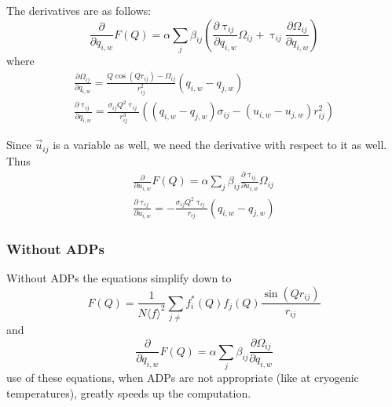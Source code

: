 \noindent The derivatives are as follows:
\begin{equation}
\frac{\partial}{\partial q_{i,w}} F{ (Q )} = \alpha \sum_{j} \beta_{ij} (\frac{\partial \uptau_{ij}}{\partial q_{i,w}}  \Omega_{ij} + \uptau_{ij} \frac{\partial \Omega_{ij}}{\partial q_{i,w}}) \label{eq:grad_fq}
\end{equation}
where
\begin{eqnarray}
  \frac{\partial \Omega_{ij}}{\partial q_{i,w}}  = \frac{Q\cos(Qr_{ij}) - \Omega_{ij}}{r_{ij}^{2}} (q_{i,w}-q_{j,w})\\
  \frac{\partial \uptau_{ij}}{\partial q_{i,w}} = \frac{\sigma_{ij}Q^{2} \uptau_{ij}}{r_{ij}^{3}}   ((q_{i,w} - q_{j,w}) \sigma_{ij}- ( u_{i,w} - u_{j,w})r_{ij}^{2})
\end{eqnarray}

Since $\vec{u}_{ij}$ is a variable as well, we need the derivative with respect to it as well.
Thus
\begin{eqnarray}
\frac{\partial}{\partial u_{i,w}} F{ (Q )} = \alpha \sum_{j} \beta_{ij} \frac{\partial \uptau_{ij}}{\partial u_{i,w}}  \Omega_{ij}\\
\frac{\partial \uptau_{ij}}{\partial u_{i,w}} = - \frac{\sigma_{ij}Q^{2} \uptau_{ij}}{r_{ij}}  (q_{i,w} - q_{j,w})
\end{eqnarray}
\subsubsection{Without ADPs}
Without ADPs the equations simplify down to
\begin{equation}
F(Q) = \frac{1}{N \langle f \rangle^{2}} \sum_{j\neq} f_i^{*}(Q)f_j(Q) \frac{\sin(Qr_{ij})}{r_{ij}}
\end{equation}
and
 \begin{equation}
\frac{\partial}{\partial q_{i,w}} F{ (Q )} = \alpha \sum_{j} \beta_{ij} \frac{\partial \Omega_{ij}}{\partial q_{i,w}}
\end{equation}
use of these equations, when ADPs are not appropriate (like at cryogenic temperatures), greatly speeds up the computation.


